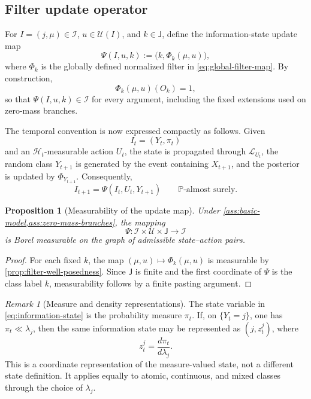 \documentclass[10pt,twocolumn]{article}
\newtheorem{proposition}{Proposition}
\theoremstyle{remark}
\newtheorem{remark}{Remark}
\newcommand{\Pp}{\mathbb{P}}
\newcommand{\Hh}{\mathcal{H}}
\newcommand{\Ucal}{\mathcal{U}}
\newcommand{\Ical}{\mathcal{I}}
\begin{document}
\subsection{Filter update operator}
\label{subsec:information-filter-update}

For $I=(j,\mu)\in\Ical$, $u\in\Ucal(I)$, and $k\in\mathsf J$, define the information-state update map
\begin{equation}
	\Psi(I,u,k)
	:=\bigl(k,\Phi_k(\mu,u)\bigr),
	\label{eq:information-update-map}
\end{equation}
where $\Phi_k$ is the globally defined normalized filter in \cref{eq:global-filter-map}. By construction,
\begin{equation*}
	\Phi_k(\mu,u)(O_k)=1,
	\label{eq:update-support-information-space}
\end{equation*}
so that $\Psi(I,u,k)\in\Ical$ for every argument, including the fixed extensions used on zero-mass branches.

The temporal convention is now expressed compactly as follows. Given
\[
I_t=(Y_t,\pi_t)
\]
and an $\Hh_t$-measurable action $U_t$, the state is propagated through $\mathcal L_{U_t}$, the random class $Y_{t+1}$ is generated by the event containing $X_{t+1}$, and the posterior is updated by $\Phi_{Y_{t+1}}$. Consequently,
\begin{equation}
	I_{t+1}
	=\Psi(I_t,U_t,Y_{t+1})
	\qquad \Pp\text{-almost surely}.
	\label{eq:information-state-recursion}
\end{equation}

\begin{proposition}[Measurability of the update map]
	\label{prop:information-update-measurable}
	Under \cref{ass:basic-model,ass:zero-mass-branches}, the mapping
	\begin{equation}
		\Psi:\Ical\times\Ucal\times\mathsf J\longrightarrow\Ical
		\label{eq:update-map-domain}
	\end{equation}
	is Borel measurable on the graph of admissible state--action pairs.
\end{proposition}

\begin{proof}
	For each fixed $k$, the map $(\mu,u)\mapsto\Phi_k(\mu,u)$ is measurable by \cref{prop:filter-well-posedness}. Since $\mathsf J$ is finite and the first coordinate of $\Psi$ is the class label $k$, measurability follows by a finite pasting argument.
\end{proof}

\begin{remark}[Measure and density representations]
	\label{rem:information-measure-density}
	The state variable in \cref{eq:information-state} is the probability measure $\pi_t$. If, on $\{Y_t=j\}$, one has $\pi_t\ll\lambda_j$, then the same information state may be represented as $(j,z_t^j)$, where
	\[
	z_t^j=\frac{d\pi_t}{d\lambda_j}.
	\]
	This is a coordinate representation of the measure-valued state, not a different state definition. It applies equally to atomic, continuous, and mixed classes through the choice of $\lambda_j$.
\end{remark}
\end{document}
